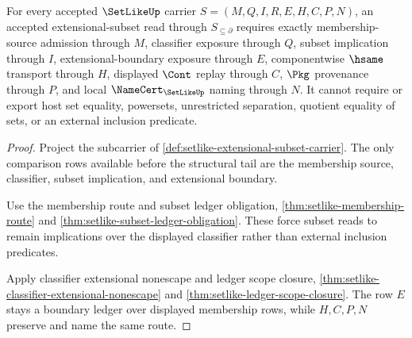\begin{theorem}
\label{thm:setlike-extensional-subset-namecert-obligations}
For every accepted $\SetLikeUp$ carrier $S=(M,Q,I,R,E,H,C,P,N)$, an accepted extensional-subset read through $S_{\subseteq\partial}$ requires exactly membership-source admission through $M$, classifier exposure through $Q$, subset implication through $I$, extensional-boundary exposure through $E$, componentwise $\hsame$ transport through $H$, displayed $\Cont$ replay through $C$, $\Pkg$ provenance through $P$, and local $\NameCert_{\SetLikeUp}$ naming through $N$. It cannot require or export host set equality, powersets, unrestricted separation, quotient equality of sets, or an external inclusion predicate.
\end{theorem}
\begin{proof}
Project the subcarrier of \autoref{def:setlike-extensional-subset-carrier}. The only comparison rows available before the structural tail are the membership source, classifier, subset implication, and extensional boundary.

Use the membership route and subset ledger obligation, \autoref{thm:setlike-membership-route} and \autoref{thm:setlike-subset-ledger-obligation}. These force subset reads to remain implications over the displayed classifier rather than external inclusion predicates.

Apply classifier extensional nonescape and ledger scope closure, \autoref{thm:setlike-classifier-extensional-nonescape} and \autoref{thm:setlike-ledger-scope-closure}. The row $E$ stays a boundary ledger over displayed membership rows, while $H,C,P,N$ preserve and name the same route.
\end{proof}

